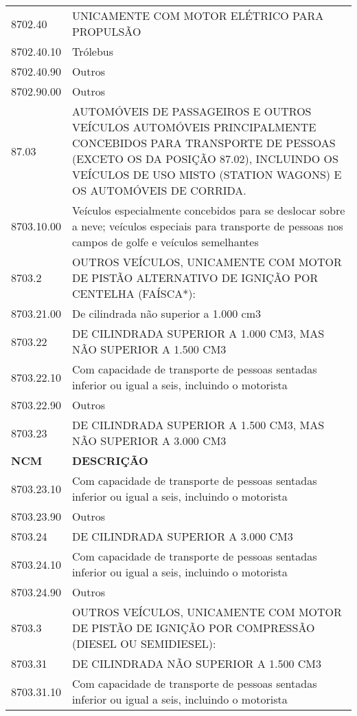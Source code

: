 \documentclass{article}
\begin{document}
\begin{center}
\begin{longtable}{
    |p{}
    |p{}|
  }
    8702.40 & UNICAMENTE COM MOTOR ELÉTRICO PARA PROPULSÃO \\
    8702.40.10 & Trólebus \\
    8702.40.90 & Outros \\
    8702.90.00 & Outros \\
    \rowcolor{lightGreen}
    87.03 & AUTOMÓVEIS DE PASSAGEIROS E OUTROS VEÍCULOS AUTOMÓVEIS PRINCIPALMENTE CONCEBIDOS PARA TRANSPORTE DE PESSOAS (EXCETO OS DA POSIÇÃO 87.02), INCLUINDO OS VEÍCULOS DE USO MISTO (STATION WAGONS) E OS AUTOMÓVEIS DE CORRIDA. \\
    8703.10.00 & Veículos especialmente concebidos para se deslocar sobre a neve; veículos especiais para transporte de pessoas nos campos de golfe e veículos semelhantes \\
    \rowcolor{lightYellow}
    8703.2 & OUTROS VEÍCULOS, UNICAMENTE COM MOTOR DE PISTÃO ALTERNATIVO DE IGNIÇÃO POR CENTELHA (FAÍSCA*): \\
    8703.21.00 & De cilindrada não superior a 1.000 cm3 \\
    \rowcolor{lightYellow}
    8703.22 & DE CILINDRADA SUPERIOR A 1.000 CM3, MAS NÃO SUPERIOR A 1.500 CM3 \\ 
    8703.22.10 & Com capacidade de transporte de pessoas sentadas inferior ou igual a seis, incluindo o motorista \\
    8703.22.90 & Outros \\
    \rowcolor{lightYellow}
    8703.23 & DE CILINDRADA SUPERIOR A 1.500 CM3, MAS NÃO SUPERIOR A 3.000 CM3 \\
    \hline
    \pagebreak
    \hline
    \rowcolor{darkGrey}
    \textbf{NCM} & \textbf{DESCRIÇÃO} \\
    8703.23.10 & Com capacidade de transporte de pessoas sentadas inferior ou igual a seis, incluindo o motorista \\
    8703.23.90 & Outros \\
    \rowcolor{lightYellow}
    8703.24 & DE CILINDRADA SUPERIOR A 3.000 CM3 \\
    8703.24.10 & Com capacidade de transporte de pessoas sentadas inferior ou igual a seis, incluindo o motorista \\
    8703.24.90 & Outros \\
    8703.3 & OUTROS VEÍCULOS, UNICAMENTE COM MOTOR DE PISTÃO DE IGNIÇÃO POR COMPRESSÃO (DIESEL OU SEMIDIESEL): \\
    8703.31 & DE CILINDRADA NÃO SUPERIOR A 1.500 CM3 \\
    8703.31.10 & Com capacidade de transporte de pessoas sentadas inferior ou igual a seis, incluindo o motorista \\

\end{longtable}
\end{center}
\end{document}
